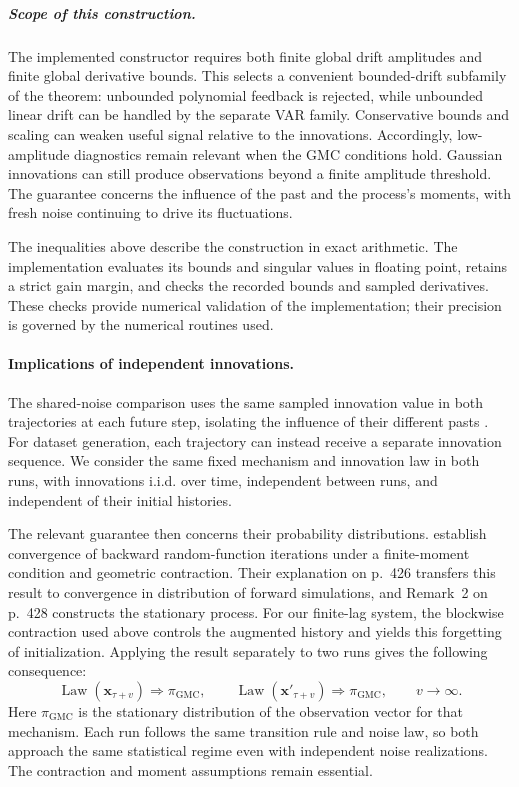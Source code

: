 \subparagraph{Scope of this construction.}
The implemented constructor requires both finite global drift amplitudes
and finite global derivative bounds. This selects a convenient bounded-drift
subfamily of the theorem: unbounded polynomial feedback is rejected, while
unbounded linear drift can be handled by the separate VAR family. Conservative
bounds and scaling can weaken useful signal relative to the innovations.
Accordingly, low-amplitude diagnostics remain relevant when the GMC conditions
hold. Gaussian innovations can still produce observations beyond a finite
amplitude threshold. The guarantee concerns the influence of the past and
the process's moments, with fresh noise continuing to drive its fluctuations.

The inequalities above describe the construction in exact arithmetic. The
implementation evaluates its bounds and singular values in floating point,
retains a strict gain margin, and checks the recorded bounds and sampled
derivatives. These checks provide numerical validation of the implementation;
their precision is governed by the numerical routines used.

\paragraph{Implications of independent innovations.}
\label{sec:implemented-shao-wu-independent-noise}
The shared-noise comparison uses the same sampled innovation value in both
trajectories at each future step, isolating the influence of their different
pasts \citep[Section~3, Eq.~(3.1), electronic reprint p.~5]{shao2007spectral}.
For dataset generation, each trajectory can instead receive a separate
innovation sequence. We consider the same fixed mechanism and innovation law
in both runs, with innovations i.i.d. over time, independent between runs, and
independent of their initial histories.

The relevant guarantee then concerns their probability distributions.
\citet[Section~2, Theorem~2, p.~427]{wu2004iterated} establish convergence of
backward random-function iterations under a finite-moment condition and
geometric contraction. Their explanation on p.~426 transfers this result to
convergence in distribution of forward simulations, and Remark~2 on p.~428
constructs the stationary process. For our finite-lag system, the blockwise
contraction used above controls the augmented history and yields this
forgetting of initialization. Applying the result separately to two runs
gives the following consequence:
\begin{equation}
 \operatorname{Law}(\mathbf x_{\tau+v})\Rightarrow\pi_{\mathrm{GMC}},
 \qquad
 \operatorname{Law}(\mathbf x'_{\tau+v})\Rightarrow\pi_{\mathrm{GMC}},
 \qquad v\to\infty.
 \label{eq:implemented-gmc-independent-laws}
\end{equation}
Here $\pi_{\mathrm{GMC}}$ is the stationary distribution of the observation
vector for that mechanism. Each run follows the same transition rule and
noise law, so both approach the same statistical regime even with independent
noise realizations. The contraction and moment assumptions remain essential.

